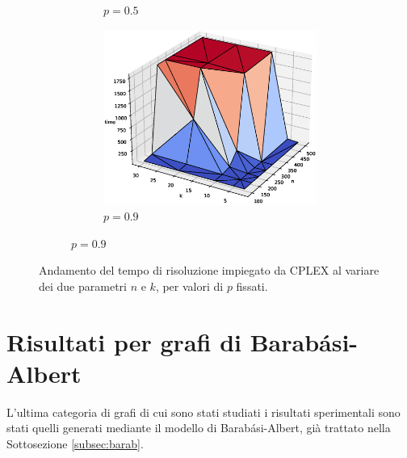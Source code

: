 \begin{figure}[h!]
\begin{subfigure}[b]{\textwidth}
\begin{subfigure}[b]{0.32\textwidth}
	         \caption{$p=0.5$}
	     \end{subfigure}
	     \hspace{0em}
	      \begin{subfigure}[b]{0.32\textwidth}
	         \includegraphics[width=\columnwidth]{images/wsg3d6.eps}
	         \caption{$p=0.9$}
	     \end{subfigure}
		\end{subfigure}
        \caption{Andamento del tempo di risoluzione impiegato da CPLEX al variare dei due parametri $n$ e $k$, per valori di $p$ fissati.}
        \label{fig:wsg3d}
\end{figure}

\newpage
\section{Risultati per grafi di Barabási-Albert}
L'ultima categoria di grafi di cui sono stati studiati i risultati sperimentali sono stati quelli generati mediante il modello di Barabási-Albert, già trattato nella Sottosezione \ref{subsec:barab}. 

